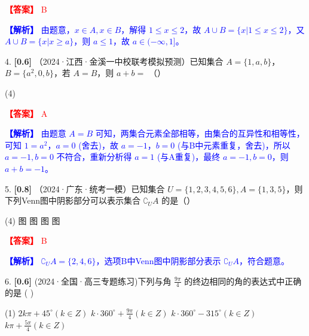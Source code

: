 \documentclass[11pt,a4paper]{article}
\begin{document}
\par\noindent\textcolor{red}{\textbf{【答案】} B}
\par\noindent\textcolor{blue}{\textbf{【解析】} 由题意，$x \in A, x \in B$，解得 $1 \leq x \leq 2$，故 $A \cup B=\{x|1 \leq x \leq 2\}$，又 $A \cup B=\{x|x \geq a\}$，则 $a \leq 1$，故 $a \in (-\infty, 1]$。}

\vspace{0.5cm}

4. \textbf{[0.6]} （2024·江西·金溪一中校联考模拟预测）已知集合 $A=\{1,a,b\}$，$B=\{a^2,0,b\}$，若 $A=B$，则 $a+b=$ （\quad）

\begin{tasks}(4)
\end{tasks}

\par\noindent\textcolor{red}{\textbf{【答案】} A}
\par\noindent\textcolor{blue}{\textbf{【解析】} 由题意 $A=B$ 可知，两集合元素全部相等，由集合的互异性和相等性，可知 $1=a^2$，$a=0$ (舍去)，故 $a=-1$，$b=0$ (与B中元素重复，舍去)，所以 $a=-1, b=0$ 不符合，重新分析得 $a=1$ (与A重复)，最终 $a=-1, b=0$，则 $a+b=-1$。}

\vspace{0.5cm}

5. \textbf{[0.8]} （2024·广东·统考一模）已知集合 $U=\{1,2,3,4,5,6\}, A=\{1,3,5\}$，则下列Venn图中阴影部分可以表示集合 $\complement_U A$ 的是（\quad）

\begin{tasks}(4)
    \task 图
    \task 图
    \task 图
    \task 图
\end{tasks}

\par\noindent\textcolor{red}{\textbf{【答案】} B}
\par\noindent\textcolor{blue}{\textbf{【解析】} $\complement_U A=\{2,4,6\}$，选项B中Venn图中阴影部分表示 $\complement_U A$，符合题意。}

\vspace{0.5cm}

6. \textbf{[0.6]} (2024·全国·高三专题练习)下列与角 $\frac{9\pi}{4}$ 的终边相同的角的表达式中正确的是 ( )

\begin{tasks}(1)
    \task $2k\pi + 45^\circ(k\in Z)$
    \task $k\cdot 360^\circ + \frac{9\pi}{4}(k\in Z)$
    \task $k\cdot 360^\circ - 315^\circ(k\in Z)$
    \task $k\pi + \frac{5\pi}{4}(k\in Z)$
\end{tasks}
\end{document}
